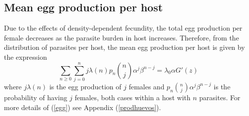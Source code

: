 \documentclass[12pt,a4paper]{article}
\theoremstyle{plain}%
\theoremstyle{definition}
\theoremstyle{remark}
\begin{document}
	

	\subsection{Mean egg production per host}
	Due to the effects of density-dependent fecundity, the total egg production per female decreases as the parasite burden in host increases.
	Therefore, from the distribution of parasites per host, the mean egg production per host %
	is given by the expression
	\begin{equation}\label{egg}
	\sum_{n\geq 0}\sum_{j=0}^{n}j\lambda(n)p_n\binom{n}{j}\alpha^j\beta^{n-j}=\lambda_0\alpha G'(z)
	\end{equation}
	where $j\lambda(n)$ is the egg production of $j$ females and $p_n\binom{n}{j}\alpha^j\beta^{n-j}$ is the probability of having $j$ females, both cases within a host with $n$ parasites. For more details of (\ref{egg}) see Appendix (\ref{prodhuevos}).
\end{document}
